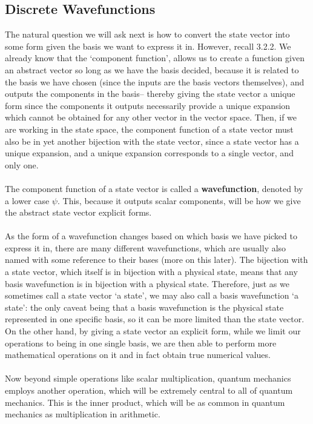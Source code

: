 \subsection{Discrete Wavefunctions}
The natural question we will ask next is how to convert the state vector into some form given the basis we want to  express it in. However, recall 3.2.2. We already know that the `component function', allows us to create a function given an abstract vector so long as we have the basis decided, because it is related to the basis we have chosen (since the inputs are the basis vectors themselves), and outputs the components in the basis-- thereby giving the state vector a unique form since the components it outputs necessarily provide a unique expansion which cannot be obtained for any other vector in the vector space. Then, if we are working in the state space, the component function of a state vector must also be in yet another bijection with the state vector, since a state vector has a unique expansion, and a unique expansion corresponds to a single vector, and only one. 
\\\\
The component function of a state vector is called a \textbf{wavefunction}, denoted by a lower case $\psi$. This, because it outputs scalar components, will be how we give the abstract state vector explicit forms.
\\\\
As the form of a wavefunction changes based on which basis we have picked to express it in, there are many different wavefunctions, which are usually also named with some reference to their bases (more on this later). The bijection with a state vector, which itself is in bijection with a physical state, means that any basis wavefunction is in bijection with a physical state. Therefore, just as we sometimes call a state vector `a state', we may also call a basis wavefunction `a state': the only caveat being that a basis wavefunction is the physical state represented in one specific basis, so it can be more limited than the state vector. On the other hand, by giving a state vector an explicit form, while we limit our operations to being in one single basis, we are then able to perform more mathematical operations on it and in fact obtain true numerical values. 
\\\\
Now beyond simple operations like scalar multiplication, quantum mechanics employs another operation, which will be extremely central to all of quantum mechanics. This is the inner product, which will be as common in quantum mechanics as multiplication in arithmetic.
